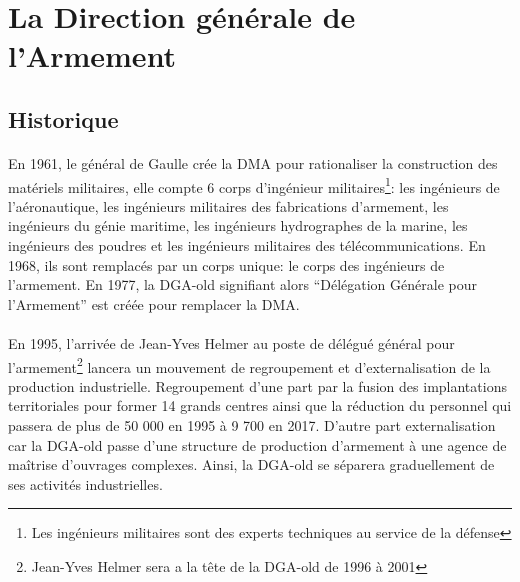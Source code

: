 \documentclass[11pt, book, english, french, standardlists]{upmethodology-document}
\begin{document}
		\section{La Direction générale de l'Armement}
			\subsection{Historique}
				\paragraph*{}
					En 1961, le général de Gaulle crée la \gls{DMA} pour rationaliser la construction des matériels militaires, elle compte 6 corps d'ingénieur militaires\footnote{Les ingénieurs militaires sont des experts techniques au service de la défense}: les ingénieurs de l'aéronautique, les ingénieurs militaires des fabrications d'armement, les ingénieurs du génie maritime, les ingénieurs hydrographes de la marine, les ingénieurs des poudres et les ingénieurs militaires des télécommunications. En 1968, ils sont remplacés par un corps unique: le corps des ingénieurs de l’armement. En 1977, la \acrshort{DGA-old} signifiant alors ``Délégation Générale pour l'Armement'' est créée pour remplacer la \gls{DMA}.
				\paragraph*{}
					En 1995, l’arrivée de Jean-Yves Helmer au poste de délégué général pour l'armement\footnote{Jean-Yves Helmer sera a la tête de la \acrshort{DGA-old} de 1996 à 2001} lancera un mouvement de regroupement et d'externalisation de la production industrielle. Regroupement d'une part par la fusion des implantations territoriales pour former 14 grands centres ainsi que la réduction du personnel qui passera de plus de 50 000 en 1995 à 9 700 en 2017. D’autre part externalisation car la \acrshort{DGA-old} passe d’une structure de production d’armement à une agence de maîtrise d’ouvrages complexes. Ainsi, la \acrshort{DGA-old} se séparera graduellement de ses activités industrielles.
\end{document}
